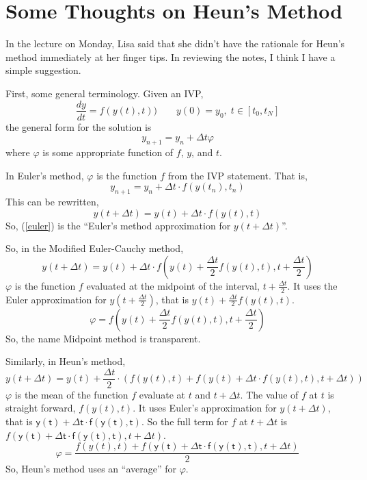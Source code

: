 \documentclass[12pt]{article}
\begin{document}
\renewcommand\thesection {}
\renewcommand\thesubsection {\Alph{subsection}.}

\section{Some Thoughts on Heun's Method}

In the lecture on Monday, Lisa said that she didn't have the rationale for Heun's method immediately at her finger tips. In reviewing the notes, I think I have a simple suggestion.

First, some general terminology. Given an IVP,
\begin{equation*}
\frac{dy}{dt} = f(y(t), t)) \qquad
y(0) = y_0,\;
t \in [t_0, t_N]
\end{equation*}
the general form for the solution is
\begin{equation}
y_{n+1} = y_n + \Delta t\varphi
\end{equation}
where $\varphi$ is some appropriate function of $f$, $y$, and $t$.

In Euler's method, $\varphi$ is the function $f$ from the IVP statement.
That is,
\begin{equation}
y_{n+1} = y_n + \Delta t\cdot f(y(t_n), t_n)
\end{equation}
This can be rewritten,
\begin{equation}
\label{euler}
y(t + \Delta t) = y(t) + \Delta t\cdot f(y(t), t)
\end{equation}
So, (\ref{euler}) is the ``Euler's method approximation for $y(t + \Delta t)$''.

So, in the Modified Euler-Cauchy method,
\begin{equation}
y(t + \Delta t) = y(t) + \Delta t\cdot f\left(y(t) + \frac{\Delta t}{2}f(y(t),t), t + \frac{\Delta t}{2}\right)
\end{equation}
$\varphi$ is the function $f$ evaluated at the midpoint of the interval, $t + \frac{\Delta t}{2}$. It uses the Euler approximation for $y(t + \frac{\Delta t}{2})$, that is $y(t) + \frac{\Delta t}{2}f(y(t),t)$.
\begin{equation}
\varphi = f\left(y(t) + \frac{\Delta t}{2}f(y(t),t), t + \frac{\Delta t}{2}\right)
\end{equation}
So, the name Midpoint method is transparent. 

Similarly, in Heun's method,
\begin{equation}
y(t + \Delta t) = y(t) + \frac{\Delta t}{2}\cdot \left(f(y(t),t) + f(y(t) + \Delta t\cdot f(y(t),t), t + \Delta t)\right)
\end{equation}
$\varphi$ is the mean of the function $f$ evaluate at $t$ and $t + \Delta t$. The value of $f$ at $t$ is straight forward, $f(y(t),t)$. It uses Euler's approximation for $y(t + \Delta t)$, that is $\mathsf{y(t) + \Delta t\cdot f(y(t),t)}$. So the full term for $f$ at $t + \Delta t$ is $f(\mathsf{y(t) + \Delta t\cdot f(y(t),t)}, t + \Delta t)$.
\begin{equation}
\varphi = \frac{f(y(t),t) + f(\mathsf{y(t) + \Delta t\cdot f(y(t),t)}, t + \Delta t)}{2}
\end{equation}
So, Heun's method uses an ``average'' for $\varphi$.
\end{document}
